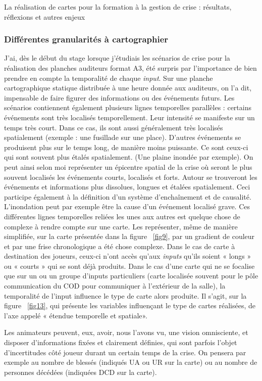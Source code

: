 \documentclass[10pt,a4paper]{report} %
\begin{document}
\begin{part}{La réalisation de cartes pour la formation à la gestion de crise : résultats, réflexions et autres enjeux}
\subsubsection{Différentes granularités à cartographier}
J’ai, dès le début du stage lorsque j’étudiais les scénarios de crise pour la réalisation des planches auditeurs format A3, été surpris par l’importance de bien prendre en compte la temporalité de chaque \textit{input}. Sur une planche cartographique statique distribuée à une heure donnée aux auditeurs, on l’a dit, impensable de faire figurer des informations ou des événements futurs. Les scénarios contiennent également plusieurs lignes temporelles parallèles : certains événements sont très localisés temporellement. Leur intensité se manifeste sur un temps très court. Dans ce cas, ils sont aussi généralement très localisés spatialement (exemple : une fusillade sur une place). D’autres événements se produisent plus sur le temps long, de manière moins puissante. Ce sont ceux-ci qui sont souvent plus étalés spatialement. (Une plaine inondée par exemple). On peut ainsi selon moi représenter un épicentre spatial de la crise où seront le plus souvent localisés les événements courts, localisés et forts. Autour se trouveront les événements et informations plus dissolues, longues et étalées spatialement. Ceci participe également à la définition d’un système d’enchaînement et de causalité. L’inondation peut par exemple être la cause d’un événement localisé grave. Ces différentes lignes temporelles reliées les unes aux autres est quelque chose de complexe à rendre compte sur une carte. Les représenter, même de manière simplifiée, sur la carte présentée dans la figure ~\ref{fig9}, par un gradient de couleur et par une frise chronologique a été chose complexe. Dans le cas de carte à destination des joueurs, ceux-ci n’ont accès qu’aux \textit{inputs} qu’ils soient « longs » ou « courts » qui se sont déjà produits. Dans le cas d’une carte qui ne se focalise que sur un ou un groupe d’inputs particuliers (carte localisée souvent pour le pôle communication du COD pour communiquer à l’extérieur de la salle), la temporalité de l’input influence le type de carte alors produite. Il s’agit, sur la figure ~\ref{fig13}, qui présente les variables influençant le type de cartes réalisées, de l’axe appelé « étendue temporelle et spatiale». 

Les animateurs peuvent, eux, avoir, nous l’avons vu, une vision omnisciente, et disposer d’informations fixées et clairement définies, qui sont parfois l’objet d’incertitudes côté joueur durant un certain temps de la crise. On pensera par exemple au nombre de blessés (indiqués UA ou UR sur la carte) ou au nombre de personnes décédées (indiquées DCD sur la carte).


\end{part}
\end{document}
